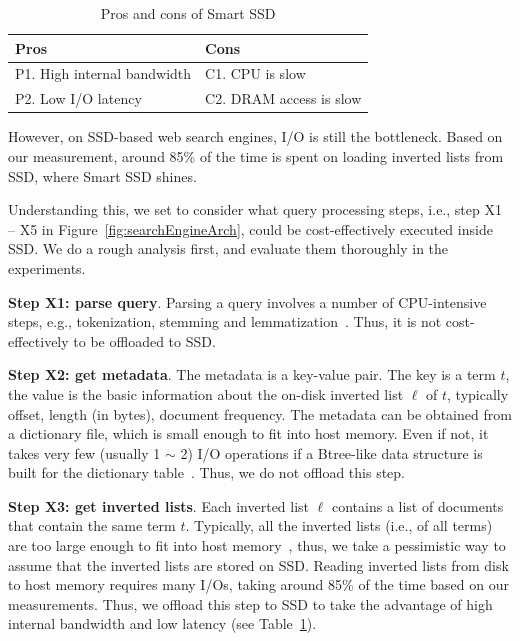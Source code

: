 \begin{table}[htbp]
\centering
\begin{tabular}{l|l}\hline\hline
\textbf{Pros}    & \textbf{Cons}\\\hline
P1. High internal bandwidth & C1. CPU is slow \\\hline
P2. Low I/O latency & C2. DRAM access is slow\\\hline\hline
\end{tabular}
\caption{Pros and cons of Smart SSD}\label{tab:SmartSSDProCon}
\end{table}

However, on SSD-based web search engines, I/O is still the bottleneck. Based on our measurement, around 85\% of the time is spent on loading inverted lists from SSD, where Smart SSD shines.

Understanding this, we set to consider what query processing steps, i.e., step X1 -- X5 in Figure~\ref{fig:searchEngineArch}, could be cost-effectively executed inside SSD. We do a rough analysis first, and evaluate them thoroughly in the experiments.

\textbf{Step X1: parse query}. Parsing a query involves a number of CPU-intensive steps, e.g., tokenization, stemming and lemmatization~\cite{M08}. Thus, it is not cost-effectively to be offloaded to SSD.

\textbf{Step X2: get metadata}. The metadata is a key-value pair. The key is a term $t$, the value is the basic information about the on-disk inverted list $\ell$ of $t$, typically offset, length (in bytes), document frequency. The metadata can be obtained from a dictionary file, which is small enough to fit into host memory. Even if not, it takes very few (usually 1 $\sim$ 2) I/O operations if a Btree-like data structure is built for the dictionary table~\cite{M08}. Thus, we do not offload this step.

\textbf{Step X3: get inverted lists}. Each inverted list $\ell$ contains a list of documents that contain the same term $t$.
Typically, all the inverted lists (i.e., of all terms) are too large enough to fit into host memory~\cite{BaezaYates07ICDE,Zhang2008,Risvik2013}, thus, we take a pessimistic way to assume that the inverted lists are stored on SSD.
Reading inverted lists from disk to host memory requires many I/Os, taking around 85\% of the time based on our measurements. Thus, we offload this step to SSD to take the advantage of high internal bandwidth and low latency (see Table~\ref{tab:SmartSSDProCon}).

